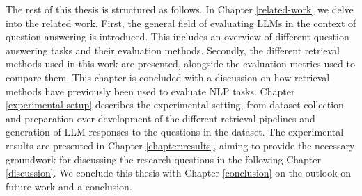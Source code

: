 The rest of this thesis is structured as follows.
In Chapter \ref{related-work} we delve into the related work.
First, the general field of evaluating LLMs in the context of question answering is introduced.
This includes an overview of different question answering tasks and their evaluation methods.
Secondly, the different retrieval methods used in this work are presented, alongside the evaluation metrics used to compare them.
This chapter is concluded with a discussion on how retrieval methods have previously been used to evaluate NLP tasks.
Chapter \ref{experimental-setup} describes the experimental setting, from dataset collection and preparation over development of the different retrieval pipelines and generation of LLM responses to the questions in the dataset.
The experimental results are presented in Chapter \ref{chapter:results}, aiming to provide the necessary groundwork for discussing the research questions in the following Chapter \ref{discussion}.
We conclude this thesis with Chapter \ref{conclusion} on the outlook on future work and a conclusion.